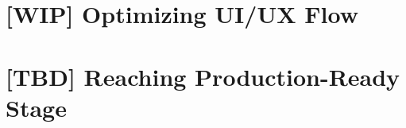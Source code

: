 \documentclass[12pt, a4paper, twoside]{extreport}
\begin{document}
\newpage
\section{[WIP] Optimizing UI/UX Flow}


\newpage
\section{[TBD] Reaching Production-Ready Stage}


\thispagestyle{empty}



~
\end{document}
